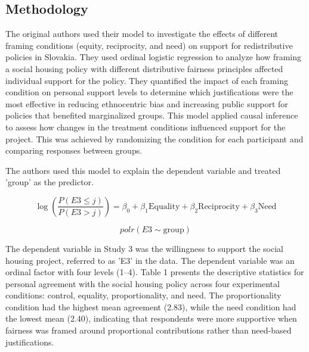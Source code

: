 \documentclass[titlepage]{article}
\begin{document}
\subsection{Methodology}
The original authors used their model to investigate the effects of different framing conditions (equity, reciprocity, and need) on support for redistributive policies in Slovakia. They used ordinal logistic regression to analyze how framing a social housing policy with different distributive fairness principles affected individual support for the policy. They quantified the impact of each framing condition on personal support levels to determine which justifications were the most effective in reducing ethnocentric bias and increasing public support for policies that benefited marginalized groups. This model applied causal inference to assess how changes in the treatment conditions influenced support for the project. This was achieved by randomizing the condition for each participant and comparing responses between groups.

\justify
The authors used this model to explain the dependent variable and treated 'group' as the predictor.

\begin{equation}
\log\left(\frac{P(E3 \leq j)}{P(E3 > j)}\right) = \beta_0 + \beta_1 \text{Equality} + \beta_2 \text{Reciprocity} + \beta_3 \text{Need}
\end{equation}

\begin{equation}
polr(E3 \sim \text{group})
\end{equation}

\justify
The dependent variable in Study 3 was the willingness to support the social housing project, referred to as 'E3' in the data. The dependent variable was an ordinal factor with four levels (1–4). Table 1 presents the descriptive statistics for personal agreement with the social housing policy across four experimental conditions: control, equality, proportionality, and need. The proportionality condition had the highest mean agreement (2.83), while the need condition had the lowest mean (2.40), indicating that respondents were more supportive when fairness was framed around proportional contributions rather than need-based justifications.
\end{document}
